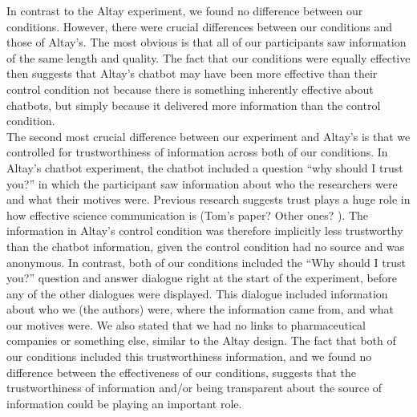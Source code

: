 \documentclass[
  english,
  ,jou,floatsintext]{apa6}
\begin{document}
In contrast to the Altay experiment, we found no difference between our conditions. However, there were crucial differences between our conditions and those of Altay's. The most obvious is that all of our participants saw information of the same length and quality. The fact that our conditions were equally effective then suggests that Altay's chatbot may have been more effective than their control condition not because there is something inherently effective about chatbots, but simply because it delivered more information than the control condition.\\
The second most crucial difference between our experiment and Altay's is that we controlled for trustworthiness of information across both of our conditions. In Altay's chatbot experiment, the chatbot included a question ``why should I trust you?'' in which the participant saw information about who the researchers were and what their motives were. Previous research suggests trust plays a huge role in how effective science communication is (Tom's paper? Other ones? ). The information in Altay's control condition was therefore implicitly less trustworthy than the chatbot information, given the control condition had no source and was anonymous. In contrast, both of our conditions included the ``Why should I trust you?'' question and answer dialogue right at the start of the experiment, before any of the other dialogues were displayed. This dialogue included information about who we (the authors) were, where the information came from, and what our motives were. We also stated that we had no links to pharmaceutical companies or something else, similar to the Altay design. The fact that both of our conditions included this trustworthiness information, and we found no difference between the effectiveness of our conditions, suggests that the trustworthiness of information and/or being transparent about the source of information could be playing an important role.
\end{document}
